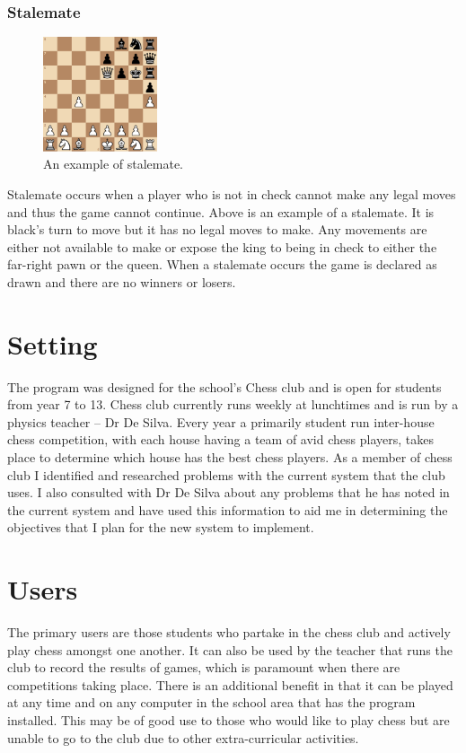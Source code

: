 \documentclass[twoside, 12pt]{report}
\begin{document}
\subsubsection{Stalemate}
\begin{figure}[H]
\centering
	\includegraphics[width=0.3\textwidth]{images/boards/stalemate_example}
	\caption{An example of stalemate.}
\end{figure}
Stalemate occurs when a player who is not in check cannot make any legal moves and thus the game cannot continue. Above is an example of a stalemate. It is black's turn to move but it has no legal moves to make. Any movements are either not available to make or expose the king to being in check to either the far-right pawn or the queen. When a stalemate occurs the game is declared as drawn and there are no winners or losers.
\section{Setting}
The program was designed for the school's Chess club and is open for students from year 7 to 13. Chess club currently runs weekly at lunchtimes and is run by a physics teacher – Dr De Silva. Every year a primarily student run inter-house chess competition, with each house having a team of avid chess players, takes place to determine which house has the best chess players. As a member of chess club I identified and researched problems with the current system that the club uses. I also consulted with Dr De Silva about any problems that he has noted in the current system and have used this information to aid me in determining the objectives that I plan for the new system to implement.
\section{Users}
The primary users are those students who partake in the chess club and actively play chess amongst one another. It can also be used by the teacher that runs the club to record the results of games, which is paramount when there are competitions taking place. There is an additional benefit in that it can be played at any time and on any computer in the school area that has the program installed. This may be of good use to those who would like to play chess but are unable to go to the club due to other extra-curricular activities.
\end{document}
